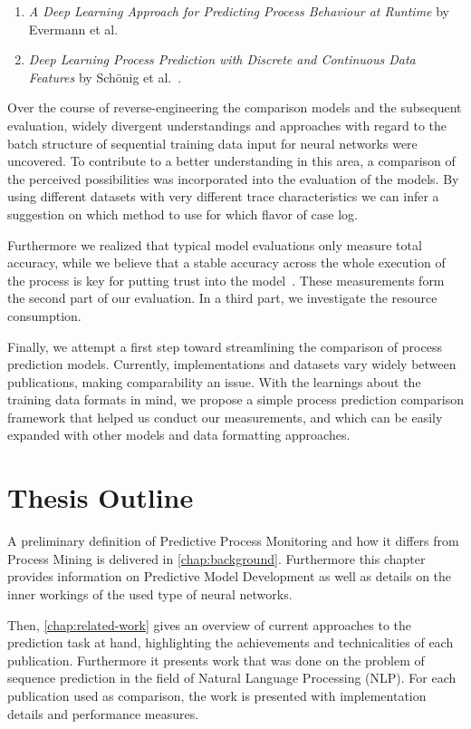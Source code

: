 \begin{enumerate}
    \item \textit{A Deep Learning Approach for Predicting Process Behaviour at Runtime} by Evermann et al.~\cite{evermann2016}
    \item\textit{Deep Learning Process Prediction with Discrete and Continuous Data Features} by Schönig et al.~\cite{schoenig2018}.
\end{enumerate}

Over the course of reverse-engineering the comparison models and the subsequent evaluation, widely divergent understandings and approaches with regard to the batch structure of sequential training data input for neural networks were uncovered. To contribute to a better understanding in this area, a comparison of the perceived possibilities was incorporated into the evaluation of the models. By using different datasets with very different trace characteristics we can infer a suggestion on which method to use for which flavor of case log.

Furthermore we realized that typical model evaluations only measure total accuracy, while we believe that a stable accuracy across the whole execution of the process is key for putting trust into the model~\cite{francescomarino2015, boehmer2018probability}. These measurements form the second part of our evaluation. In a third part, we investigate the resource consumption.

Finally, we attempt a first step toward streamlining the comparison of process prediction models. Currently, implementations and datasets vary widely between publications, making comparability an issue. With the learnings about the training data formats in mind, we propose a simple process prediction comparison framework that helped us conduct our measurements, and which can be easily expanded with other models and data formatting approaches.

\section{Thesis Outline}\label{sec:intro:outline}
A preliminary definition of Predictive Process Monitoring and how it differs from Process Mining is delivered in \autoref{chap:background}. Furthermore this chapter provides information on Predictive Model Development as well as details on the inner workings of the used type of neural networks.

Then, \autoref{chap:related-work} gives an overview of current approaches to the prediction task at hand, highlighting the achievements and technicalities of each publication. Furthermore it presents work that was done on the problem of sequence prediction in the field of Natural Language Processing (NLP). For each publication used as comparison, the work is presented with implementation details and performance measures.

